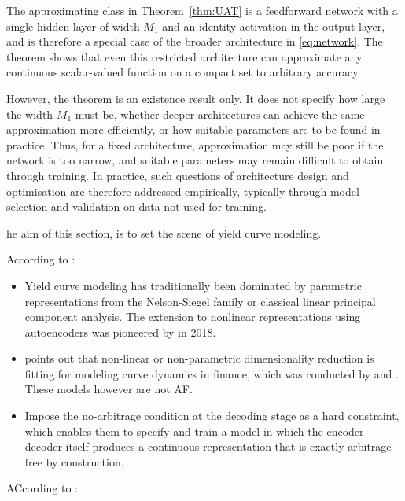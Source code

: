 The approximating class in Theorem~\ref{thm:UAT} is a feedforward network with a single hidden layer of width $M_1$ and an identity activation in the output layer, and is therefore a special case of the broader architecture in \eqref{eq:network}. The theorem shows that even this restricted architecture can approximate any continuous scalar-valued function on a compact set to arbitrary accuracy.

However, the theorem is an existence result only. It does not specify how large the width $M_1$ must be, whether deeper architectures can achieve the same approximation more efficiently, or how suitable parameters are to be found in practice. Thus, for a fixed architecture, approximation may still be poor if the network is too narrow, and suitable parameters may remain difficult to obtain through training. In practice, such questions of architecture design and optimisation are therefore addressed empirically, typically through model selection and validation on data not used for training.









he aim of this section, is to set the scene of yield curve modeling.


According to \citep{MatinWanPoulsen2025}: 

\begin{itemize}
    \item Yield curve modeling has traditionally been dominated by parametric representations from the Nelson-Siegel family or classical linear principal component analysis. The extension to nonlinear representations using autoencoders was pioneered by \cite{Kondratyev2018} in 2018. 
    \item points out that non-linear or non-parametric dimensionality reduction is fitting for modeling curve dynamics in finance, which was conducted by \cite{Sokol2022} and \cite{Kondratyev2018}. These models however are not AF.
    \item Impose the no-arbitrage condition at the decoding stage as a hard constraint, which enables them to specify and train a model in which the encoder-decoder itself produces a continuous representation that is exactly arbitrage-free by construction.
    
\end{itemize}


ACcording to \cite{Andreasen2023}: 

